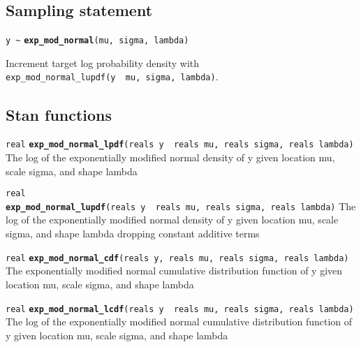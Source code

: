 \documentclass[
  10pt,
]{book}
\begin{document}
\hypertarget{sampling-statement-25}{%
\subsection{Sampling statement}\label{sampling-statement-25}}

\texttt{y\ \textasciitilde{}} \textbf{\texttt{exp\_mod\_normal}}\texttt{(mu,\ sigma,\ lambda)}

Increment target log probability density with \texttt{exp\_mod\_normal\_lupdf(y\ \textbar{}\ mu,\ sigma,\ lambda)}.

\hypertarget{stan-functions-24}{%
\subsection{Stan functions}\label{stan-functions-24}}


\texttt{real} \textbf{\texttt{exp\_mod\_normal\_lpdf}}\texttt{(reals\ y\ \textbar{}\ reals\ mu,\ reals\ sigma,\ reals\ lambda)}\newline
The log of the exponentially modified normal density of y given
location mu, scale sigma, and shape lambda


\texttt{real} \textbf{\texttt{exp\_mod\_normal\_lupdf}}\texttt{(reals\ y\ \textbar{}\ reals\ mu,\ reals\ sigma,\ reals\ lambda)}\newline
The log of the exponentially modified normal density of y given
location mu, scale sigma, and shape lambda dropping constant additive terms


\texttt{real} \textbf{\texttt{exp\_mod\_normal\_cdf}}\texttt{(reals\ y,\ reals\ mu,\ reals\ sigma,\ reals\ lambda)}\newline
The exponentially modified normal cumulative distribution function of
y given location mu, scale sigma, and shape lambda


\texttt{real} \textbf{\texttt{exp\_mod\_normal\_lcdf}}\texttt{(reals\ y\ \textbar{}\ reals\ mu,\ reals\ sigma,\ reals\ lambda)}\newline
The log of the exponentially modified normal cumulative distribution
function of y given location mu, scale sigma, and shape lambda
\end{document}
